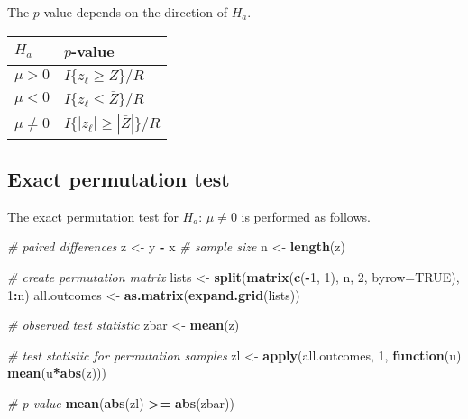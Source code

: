 \documentclass[
]{book}
\newenvironment{Shaded}{\begin{snugshade}}{\end{snugshade}}
\newcommand{\CommentTok}[1]{\textcolor[rgb]{0.56,0.35,0.01}{\textit{#1}}}
\newcommand{\ControlFlowTok}[1]{\textcolor[rgb]{0.13,0.29,0.53}{\textbf{#1}}}
\newcommand{\DataTypeTok}[1]{\textcolor[rgb]{0.13,0.29,0.53}{#1}}
\newcommand{\DecValTok}[1]{\textcolor[rgb]{0.00,0.00,0.81}{#1}}
\newcommand{\KeywordTok}[1]{\textcolor[rgb]{0.13,0.29,0.53}{\textbf{#1}}}
\newcommand{\NormalTok}[1]{#1}
\newcommand{\OperatorTok}[1]{\textcolor[rgb]{0.81,0.36,0.00}{\textbf{#1}}}
\newcommand{\OtherTok}[1]{\textcolor[rgb]{0.56,0.35,0.01}{#1}}
\newcommand{\StringTok}[1]{\textcolor[rgb]{0.31,0.60,0.02}{#1}}
\begin{document}
The \(p\)-value depends on the direction of \(H_a\).

\begin{longtable}[]{@{}ll@{}}
\toprule
\(H_a\) & \(p\)-value\tabularnewline
\midrule
\endhead
\(\mu > 0\) & \(I\{z_\ell \geq \bar{Z}\} / R\)\tabularnewline
\(\mu < 0\) & \(I\{z_\ell \leq \bar{Z}\} / R\)\tabularnewline
\(\mu \neq 0\) & \(I\{|z_\ell| \geq |\bar{Z}|\} / R\)\tabularnewline
\bottomrule
\end{longtable}

\hypertarget{exact-permutation-test}{%
\subsection{Exact permutation test}\label{exact-permutation-test}}

The exact permutation test for \(H_a\): \(\mu \neq 0\) is performed as follows.

\begin{Shaded}
\begin{Highlighting}[]
\CommentTok{# paired differences}
\NormalTok{z <-}\StringTok{ }\NormalTok{y }\OperatorTok{-}\StringTok{ }\NormalTok{x}
\CommentTok{# sample size}
\NormalTok{n <-}\StringTok{ }\KeywordTok{length}\NormalTok{(z)}

\CommentTok{# create permutation matrix}
\NormalTok{lists <-}\StringTok{ }\KeywordTok{split}\NormalTok{(}\KeywordTok{matrix}\NormalTok{(}\KeywordTok{c}\NormalTok{(}\OperatorTok{-}\DecValTok{1}\NormalTok{, }\DecValTok{1}\NormalTok{), n, }\DecValTok{2}\NormalTok{, }\DataTypeTok{byrow=}\OtherTok{TRUE}\NormalTok{), }\DecValTok{1}\OperatorTok{:}\NormalTok{n)}
\NormalTok{all.outcomes <-}\StringTok{ }\KeywordTok{as.matrix}\NormalTok{(}\KeywordTok{expand.grid}\NormalTok{(lists))}

\CommentTok{# observed test statistic}
\NormalTok{zbar <-}\StringTok{ }\KeywordTok{mean}\NormalTok{(z)}

\CommentTok{# test statistic for permutation samples}
\NormalTok{zl <-}\StringTok{ }\KeywordTok{apply}\NormalTok{(all.outcomes, }\DecValTok{1}\NormalTok{, }\ControlFlowTok{function}\NormalTok{(u) }\KeywordTok{mean}\NormalTok{(u}\OperatorTok{*}\KeywordTok{abs}\NormalTok{(z)))}

\CommentTok{# p-value}
\KeywordTok{mean}\NormalTok{(}\KeywordTok{abs}\NormalTok{(zl) }\OperatorTok{>=}\StringTok{ }\KeywordTok{abs}\NormalTok{(zbar))}
\end{Highlighting}
\end{Shaded}
\end{document}
